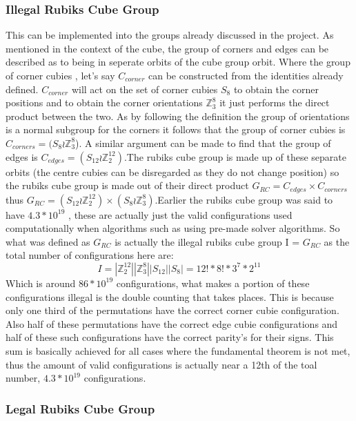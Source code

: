 \documentclass{article}
\begin{document}
\subsubsection{Illegal Rubiks Cube Group}
This can be implemented into the groups already discussed in the project. As mentioned in the context of the cube, the group of corners and edges can be described as to being in seperate orbits of the cube group orbit. Where the group of corner cubies , let's say $C_{corner}$ can be constructed from the identities already defined. $C_{corner}$ will act on the set of corner cubies $S_{8}$ to obtain the corner positions and to obtain the corner orientations $\mathbb{Z}_{3}^{8}$ it just performs the direct product between the two. As by following the definition the group of orientations is a normal subgroup for the corners it follows that the group of corner cubies is $C_{corners} = (S_8 \wr \mathbb{Z}_{3}^{8}$). A similar argument can be made to find that the group of edges is $C_{edges} = (S_{12} \wr \mathbb{Z}_{2}^{12})$.\newline The rubiks cube group is made up of these separate orbits (the centre cubies can be disregarded as they do not change position) so the rubiks cube group is made out of their direct product $G_{RC} = C_{edges} \times C_{corners}$ thus $G_{RC} = (S_{12} \wr \mathbb{Z}_{2}^{12}) \times (S_8 \wr \mathbb{Z}_{3}^{8})$.\newline Earlier the rubiks cube group was said to have $4.3*10^{19}$ , these are actually just the valid configurations used computationally when algorithms such as using pre-made solver algorithms. So what was defined as $G_{RC}$ is actually the illegal rubiks cube group I = $G_{RC}$ as the total number of configurations here are:
\begin{equation}
I = |\mathbb{Z}_{2}^{12}||\mathbb{Z}_{3}^{8}||S_{12}||S_8| =  12! * 8! * 3^7 * 2^{11}
\end{equation}
Which is around $86 * 10^{19}$ configurations, what makes a portion of these configurations illegal is the double counting that takes places. This is because only one third of the permutations have the correct corner cubie configuration. Also half of these permutations have the correct edge cubie configurations and half of these such configurations have the correct parity's for their signs. This sum is basically achieved for all cases where the fundamental theorem is not met, thus the amount of valid configurations is actually near a 12th of the toal number,  $4.3*10^{19}$ configurations. 
\subsubsection{Legal Rubiks Cube Group}
\end{document}

